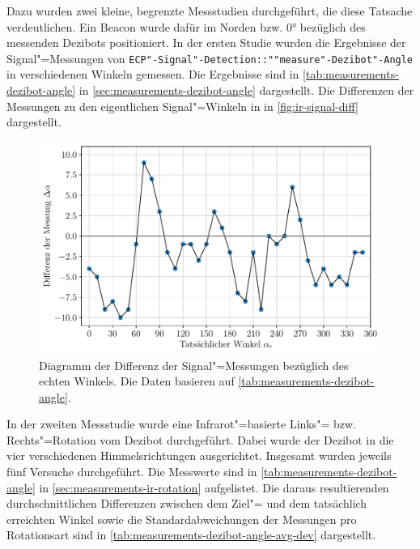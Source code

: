 {Dazu wurden zwei kleine, begrenzte Messstudien durchgeführt, die diese Tatsache verdeutlichen. Ein Beacon wurde dafür im Norden bzw. 0° bezüglich des messenden Dezibots positioniert. In der ersten Studie wurden die Ergebnisse der Signal"=Messungen von \texttt{ECP"-Signal"-Detection::""measure"-Dezibot"-Angle} in verschiedenen Winkeln gemessen. Die Ergebnisse sind in \autoref{tab:measurements-dezibot-angle} in \autoref{sec:measurements-dezibot-angle} dargestellt. Die Differenzen der Messungen zu den eigentlichen Signal"=Winkeln in in \autoref{fig:ir-signal-diff} dargestellt.

\begin{figure}[h]
    \centering
    \includegraphics[width=\textwidth]{../plot/ir_signal_diff.pdf}
    \caption{Diagramm der Differenz der Signal"=Messungen bezüglich des echten Winkels. Die Daten basieren auf \autoref{tab:measurements-dezibot-angle}.}
    \label{fig:ir-signal-diff}
\end{figure}

In der zweiten Messstudie wurde eine Infrarot"=basierte Links"= bzw. Rechts"=Rotation vom Dezibot durchgeführt. Dabei wurde der Dezibot in die vier verschiedenen Himmelsrichtungen ausgerichtet. Insgesamt wurden jeweils fünf Versuche durchgeführt. Die Messwerte sind in \autoref{tab:measurements-dezibot-angle} in \autoref{sec:measurements-ir-rotation} aufgelistet. Die daraus resultierenden durchschnittlichen Differenzen zwischen dem Ziel"= und dem tatsächlich erreichten Winkel sowie die Standardabweichungen der Messungen pro Rotationsart sind in \autoref{tab:measurements-dezibot-angle-avg-dev} dargestellt.

\begin{table}[h]
    \centering
    
    \caption{Durchschnittliche Differenzen vom Ziel"= und dem tatsächlich erreichten Winkel sowie Standardabweichungen der Messungen pro Rotationsart von Links"= (L) und Rechts"=Rotationen (R) basierend auf \autoref{tab:measurements-dezibot-angle}.}
    \label{tab:measurements-dezibot-angle-avg-dev}
\end{table}

}
